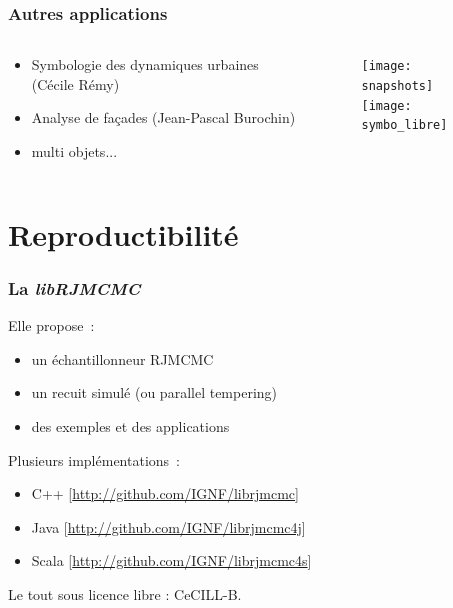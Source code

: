 \documentclass{beamer}
\begin{document}
\begin{frame}
\frametitle{Autres applications}
\begin{columns}
\begin{column}{0.5\textwidth}
\begin{itemize}
\item Symbologie des dynamiques urbaines (Cécile Rémy)
\item Analyse de façades (Jean-Pascal Burochin)
\item multi objets...
\end{itemize}
\end{column}
\begin{column}{0.5\textwidth}
\begin{figure}
\texttt{[image: snapshots]}\\
\texttt{[image: symbo\_libre]}
\end{figure}
\end{column}
\end{columns}
\end{frame}

\section{Reproductibilité}
\begin{frame}
\frametitle{La \emph{libRJMCMC}}
Elle propose~:
\begin{itemize}
\item un \'echantillonneur RJMCMC
\item un recuit simul\'e (ou parallel tempering)
\item des exemples et des applications
\end{itemize}
Plusieurs impl\'ementations~:
\begin{itemize}
\item C++ \small[\url{http://github.com/IGNF/librjmcmc}]
\item Java \small[\url{http://github.com/IGNF/librjmcmc4j}]
\item Scala \small[\url{http://github.com/IGNF/librjmcmc4s}]
\end{itemize}
Le tout sous licence libre : CeCILL-B.
\end{frame}
\end{document}
